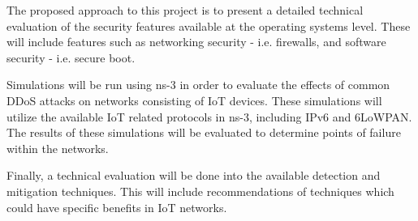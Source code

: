 The proposed approach to this project is to present a detailed technical
evaluation of the security features available at the operating systems
level. These will include features such as networking security - i.e.
firewalls, and software security - i.e. secure boot.

Simulations will be run using ns-3 in order to evaluate the effects of
common DDoS attacks on networks consisting of IoT devices. These simulations
will utilize the available IoT related protocols in ns-3, including IPv6 and
6LoWPAN. The results of these simulations will be evaluated to determine points
of failure within the networks.

Finally, a technical evaluation will be done into the available detection and
mitigation techniques. This will include recommendations of techniques which
could have specific benefits in IoT networks.
